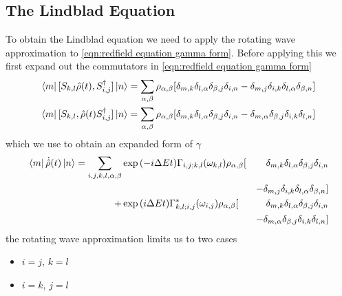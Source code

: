 \subsection{The Lindblad Equation}
To obtain the Lindblad equation
we need to apply the rotating
wave approximation to
\cref{eqn:redfield equation gamma form}.
Before applying this
we first expand out the commutators
in \cref{eqn:redfield equation gamma form}
\begin{align}
    \bra{m}[S_{k, l}\hat{\rho}(t),
    S^\dagger_{i, j}] \ket{n}              & =
    \sum_{\alpha, \beta} \rho_{\alpha, \beta} [
        \delta_{m, k}\delta_{l, \alpha}
        \delta_{\beta, j}\delta_{i, n}
        -\delta_{m, j}\delta_{i, k}
    \delta_{l, \alpha}\delta_{\beta, n}]       \\
    \bra{m}[S_{k, l},
    \hat{\rho}(t)S^\dagger_{i, j}] \ket{n} & =
    \sum_{\alpha, \beta} \rho_{\alpha, \beta} [
        \delta_{m, k}\delta_{l, \alpha}
        \delta_{\beta, j}\delta_{i, n}
        -\delta_{m, \alpha}\delta_{\beta, j}
        \delta_{i, k}\delta_{l, n}]
\end{align}
which we use to obtain an expanded
form of \(\gamma{}\)
\begin{equation}
    \bra{m}\dot{\hat{\rho}}(t) \ket{n} = \begin{aligned}[t]
        \sum_{i,j,k, l, \alpha, \beta} &
        \exp{(-i\Delta{}Et)}
        \Gamma_{i,j;k, l}(\omega_{k,l})
        \rho_{\alpha, \beta} [         &
            \delta_{m, k}\delta_{l, \alpha}
        \delta_{\beta, j}\delta_{i, n}                          \\
                                       &                      &
            -\delta_{m, j}\delta_{i, k}
        \delta_{l, \alpha}\delta_{\beta, n}]                    \\
        +                              & \exp{(i\Delta{}E t)}
        \Gamma^*_{k, l; i,j}(\omega_{i,j})
        \rho_{\alpha, \beta} [         &
            \delta_{m, k}\delta_{l, \alpha}
        \delta_{\beta, j}\delta_{i, n}                          \\
                                       &                      &
            - \delta_{m, \alpha}\delta_{\beta, j}
            \delta_{i, k}\delta_{l, n}]
    \end{aligned}
\end{equation}
the rotating wave approximation
limits us to two cases
\begin{itemize}
    \item \(i=j\), \(k=l\)
    \item \(i=k\), \(j=l\)
\end{itemize}
